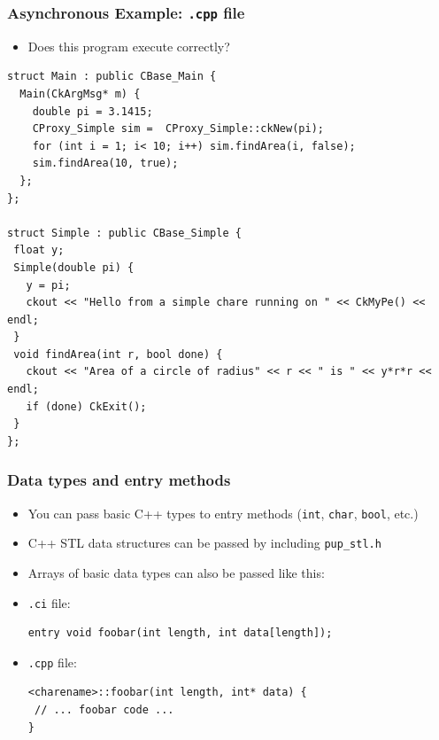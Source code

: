\begin{frame}[fragile]
  \frametitle{Asynchronous Example: \texttt{.cpp} file}
\begin{itemize}
  \item Does this program execute correctly?
\end{itemize}
\scriptsize
\begin{lstlisting}[basicstyle=\footnotesize]
struct Main : public CBase_Main {
  Main(CkArgMsg* m) {
    double pi = 3.1415;
    CProxy_Simple sim =  CProxy_Simple::ckNew(pi);
    for (int i = 1; i< 10; i++) sim.findArea(i, false);
    sim.findArea(10, true);
  };
};

struct Simple : public CBase_Simple {
 float y;
 Simple(double pi) {
   y = pi;
   ckout << "Hello from a simple chare running on " << CkMyPe() << endl;
 }
 void findArea(int r, bool done) {
   ckout << "Area of a circle of radius" << r << " is " << y*r*r << endl;
   if (done) CkExit();
 }
};
\end{lstlisting}
\end{frame}

\begin{frame}[fragile]
  \frametitle{Data types and entry methods}
\begin{itemize}
  \item You can pass basic C++ types to entry methods (\texttt{int},
    \texttt{char}, \texttt{bool}, etc.)
  \item C++ STL data structures can be passed by including \texttt{pup\_stl.h}
  \item Arrays of basic data types can also be passed like this:\\
  \item \texttt{.ci} file:
\begin{lstlisting}
entry void foobar(int length, int data[length]);
\end{lstlisting}
  \item \texttt{.cpp} file:
\begin{lstlisting}
<charename>::foobar(int length, int* data) {
 // ... foobar code ...
}
\end{lstlisting}
\end{itemize}
\end{frame}

